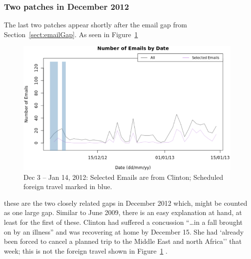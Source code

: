 \documentclass[journal]{vgtc}                %
\begin{document}
\subsubsection{Two patches in December 2012}
The last two patches appear 
shortly after the email gap from Section~\ref{sect:emailGap}.  As seen in Figure~\ref{fig:ZeroEmailsDec2012}
\begin{figure}[h]
\begin{center}
\includegraphics[width=0.95\linewidth]{ZeroEmailsDec2012}
\caption{Dec 3 -- Jan 14, 2012:  Selected Emails are from Clinton; Scheduled foreign travel marked in blue.}
\label{fig:ZeroEmailsDec2012}
\end{center}
\end{figure}
these are the two closely related gaps in December 2012 which,
might be counted as one large gap.
Similar to June 2009, there is an easy explanation at hand, at least for the first of these.  Clinton had suffered a concussion ``\ldots in a fall brought on by an illness'' \cite{concussion} and was recovering at home by December 15.  She had `already been forced to cancel a planned trip to the Middle East and north Africa'' \cite{concussion} that week; this is not the foreign travel shown in Figure~\ref{fig:ZeroEmailsDec2012} \cite{ForeignSched}.  
\end{document}
